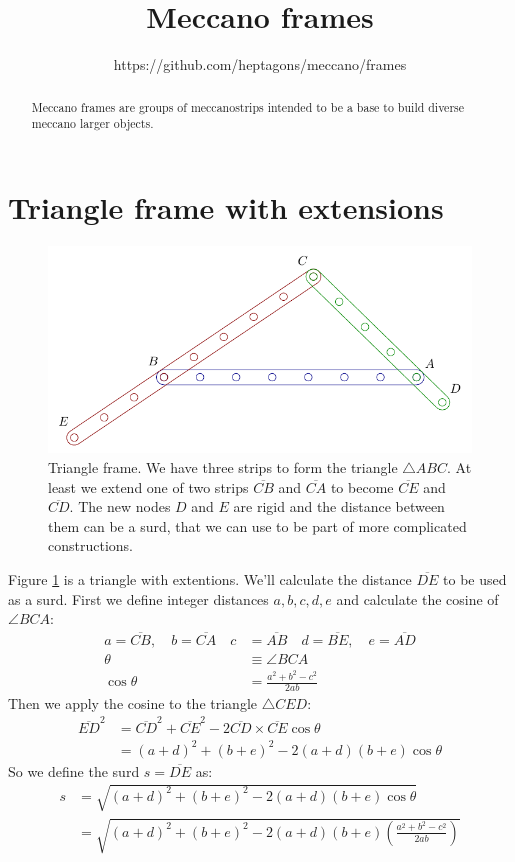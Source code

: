 \documentclass[11pt]{article}
\title{\textbf{Meccano frames}}
\author{https://github.com/heptagons/meccano/frames}
\date{}
\begin{document}
\maketitle
\begin{abstract}
Meccano frames are groups of meccano\meccanoref strips intended to be a
base to build diverse meccano larger objects.
\end{abstract}

\section{Triangle frame with extensions}

\begin{figure}[h]
\centering
\includegraphics[scale=0.75]{frame_triangle}
\caption{Triangle frame. We have three strips to form the triangle $\triangle{ABC}$.
At least we extend one of two strips $\overline{CB}$ and $\overline{CA}$ to become
$\overline{CE}$ and $\overline{CD}$. The new nodes $D$ and $E$ are rigid and the distance
between them can be a surd, that we can use to be part of more complicated constructions.}
\label{fig:triangle}
\end{figure}

Figure \ref{fig:triangle} is a triangle with extentions. We'll calculate the distance
$\overline{DE}$ to be used as a surd. First we define integer distances $a,b,c,d,e$
and calculate the cosine of $\angle{BCA}$:
\begin{align}
a = \overline{CB}, \quad b = \overline{CA}  \quad c &= \overline{AB}
 \quad d =\overline{BE}, \quad e = \overline{AD} \\
\theta &\equiv \angle{BCA} \\
\cos\theta &= \frac{a^2 + b^2 - c^2}{2ab}
\end{align}
Then we apply the cosine to the triangle $\triangle{CED}$:
\begin{align}
\overline{ED}^2 &= \overline{CD}^2 + \overline{CE}^2
 - 2\overline{CD} \times \overline{CE}\cos\theta \nonumber\\
 &= (a+d)^2 + (b+e)^2 - 2(a+d)(b+e)\cos\theta
\end{align}
So we define the surd $s = \overline{DE}$ as:
\begin{align}
 s &= \sqrt{(a+d)^2 + (b+e)^2 - 2(a+d)(b+e)\cos\theta} \nonumber\\
  &=  \sqrt{(a+d)^2 + (b+e)^2 - 2(a+d)(b+e)\left(\frac{a^2 + b^2 - c^2}{2ab}\right)}
\end{align}
\end{document}
